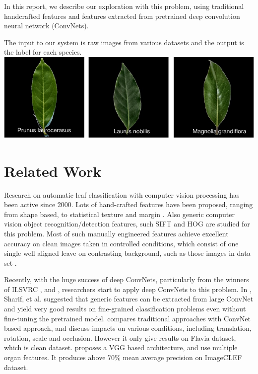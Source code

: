 \documentclass[journal, 10pt]{IEEEtran}
\begin{document}
In this report, we describe our exploration with this problem, using traditional handcrafted features and features extracted from pretrained deep convolution neural network (ConvNets). 

The input to our system is raw images from various datasets and the output is the label for each species.
\centering\includegraphics[width=0.65\linewidth]{easilyconfused}


\section{Related Work }
Research on automatic leaf classification with computer vision processing has been active since 2000. Lots of hand-crafted features have been proposed, ranging from shape based, to statistical texture and margin \cite{Charles13} \cite{Pedro13} \cite{Cho2002}. Also generic computer vision object recognition/detection features, such SIFT\cite{SIFT} and HOG\cite{HOG} are studied for this problem.  Most of such manually engineered features achieve excellent accuracy on clean images taken in controlled conditions, which consist of one single well aligned leave on contrasting background, such as those images in data set \cite{SwedishLeafDataset}.

Recently, with the huge success of deep ConvNets, particularly from the winners of ILSVRC \cite{Alex2014} \cite{VGGNetReference}, \cite{GoogleNetReference} and \cite{ResNet}, researchers start to apply deep ConvNets to this problem.  In \cite{CNNOfTheShelf}, Sharif, et al. suggested that generic features can be extracted from large ConvNet and yield very good results on fine-grained classification problems even without fine-tuning the pretrained model.  \cite{EvaluationOfLeafConv} compares traditional approaches with ConvNet based approach, and discuss impacts on various conditions, including translation, rotation, scale and occlusion. However it only give results on Flavia\cite{FlaviaDataset} dataset, which is clean dataset. \cite{PlantIdentificationConv} proposes a VGG\cite{VGGNetReference} based architecture, and use multiple organ features. It produces above 70\% mean average precision on ImageCLEF dataset\cite{ImageCLEF2013}.  
\end{document}
